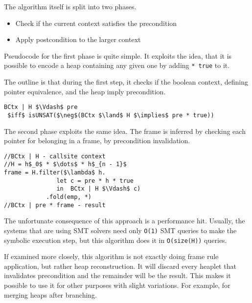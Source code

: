 \documentclass[sigplan,screen,review]{acmart}
\begin{document}
\begin{prooftree}
\end{prooftree}

The algorithm itself is split into two phases. 

\begin{itemize}
    \item Check if the current context satisfies the precondition
    \item Apply postcondition to the larger context
\end{itemize}

Pseudocode for the first phase is quite simple. It exploits the idea, that it is possible to encode a heap containing any given one by adding \texttt{* true} to it. 

The outline is that during the first step, it checks if the boolean context, defining pointer equivalence, and the heap imply precondition.

\begin{lstlisting}[mathescape]
BCtx | H $\Vdash$ pre 
 $iff$ isUNSAT($\neg$(BCtx $\land$ H $\implies$ pre * true))
\end{lstlisting}

The second phase exploits the same idea. The frame is inferred by checking each pointer for belonging in a frame, by precondition invalidation.

\begin{lstlisting}[mathescape]
//BCtx | H - callsite context
//H = h$_0$ * $\dots$ * h$_{n - 1}$
frame = H.filter($\lambda$ h. 
               let c = pre * h * true 
               in  BCtx | H $\Vdash$ c)
            .fold(emp, *)
//BCtx | pre * frame - result
\end{lstlisting}

The unfortunate consequence of this approach is a performance hit. Usually, the systems that are using SMT solvers need only \texttt{O(1)} SMT queries to make the symbolic execution step, but this algorithm does it in \texttt{O(size(H))} queries. 

If examined more closely, this algorithm is not exactly doing frame rule application, but rather heap reconstruction. It will discard every heaplet that invalidates precondition and the remainder will be the result. This makes it possible to use it for other purposes with slight variations. For example, for merging heaps after branching. 
\end{document}
